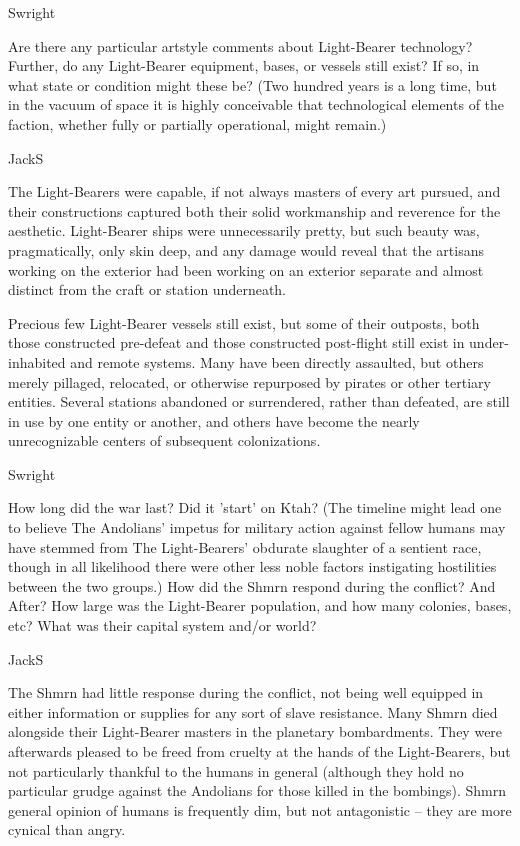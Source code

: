 Swright

Are there any particular artstyle comments about Light-Bearer
technology? Further, do any Light-Bearer equipment, bases, or vessels
still exist? If so, in what state or condition might these be? (Two
hundred years is a long time, but in the vacuum of space it is highly
conceivable that technological elements of the faction, whether fully
or partially operational, might remain.)

JackS

The Light-Bearers were capable, if not always masters of every art
pursued, and their constructions captured both their solid workmanship
and reverence for the aesthetic. Light-Bearer ships were unnecessarily
pretty, but such beauty was, pragmatically, only skin deep, and any
damage would reveal that the artisans working on the exterior had been
working on an exterior separate and almost distinct from the craft or
station underneath.

Precious few Light-Bearer vessels still exist, but some of their
outposts, both those constructed pre-defeat and those constructed
post-flight still exist in under-inhabited and remote systems. Many
have been directly assaulted, but others merely pillaged, relocated,
or otherwise repurposed by pirates or other tertiary entities. Several
stations abandoned or surrendered, rather than defeated, are still in
use by one entity or another, and others have become the nearly
unrecognizable centers of subsequent colonizations.

Swright

How long did the war last? Did it 'start' on Ktah? (The timeline might
lead one to believe The Andolians' impetus for military action against
fellow humans may have stemmed from The Light-Bearers' obdurate
slaughter of a sentient race, though in all likelihood there were
other less noble factors instigating hostilities between the two
groups.) How did the Shmrn respond during the conflict? And After? How
large was the Light-Bearer population, and how many colonies, bases,
etc? What was their capital system and/or world?

JackS

The Shmrn had little response during the conflict, not being well
equipped in either information or supplies for any sort of slave
resistance. Many Shmrn died alongside their Light-Bearer masters in
the planetary bombardments. They were afterwards pleased to be freed
from cruelty at the hands of the Light-Bearers, but not particularly
thankful to the humans in general (although they hold no particular
grudge against the Andolians for those killed in the bombings). Shmrn
general opinion of humans is frequently dim, but not antagonistic --
they are more cynical than angry.

